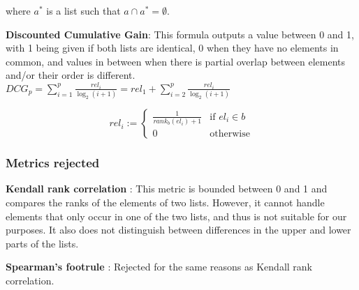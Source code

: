 \begin{description}
	      where \(a^{*}\) is a list such that \(a \cap a^{*} = \emptyset\).

	\item \textbf{Discounted Cumulative Gain}:
	      This formula outputs a value between 0 and 1, with 1 being given if both lists are identical, 0 when they have no elements in common, and values in between when there is partial overlap between elements and/or their order is different.
	      ${DCG_{p}} =\sum _{i=1}^{p}{\frac {rel_{i}}{\log _{2}(i+1)}}=rel_{1}+\sum _{i=2}^{p}{\frac {rel_{i}}{\log _{2}(i+1)}}$
\end{description}

\[
	rel_{i} :=
	\begin{cases}
		\frac{1}{rank_{b}(el_{i}) + 1} & \text{if } el_{i} \in b \\
		0                              & \text{otherwise}
	\end{cases}
\]
\subsubsection{Metrics rejected}
\begin{description}
	\item \textbf{Kendall rank correlation} \cite{kendallNEWMEASURERANK1938b}: This metric is bounded between 0 and 1 and compares the ranks of the elements of two lists. However, it cannot handle elements that only occur in one of the two lists, and thus is not suitable for our purposes. It also does not distinguish between differences in the upper and lower parts of the lists.
	\item \textbf{Spearman's footrule} \cite{spearmanCorrelationCalculatedFaulty1910}: Rejected for the same reasons as Kendall rank correlation.
\end{description}


